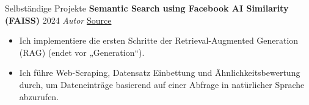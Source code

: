 \begin{rubric}{Selbständige Projekte}
\entry*[] \textbf{Semantic Search using Facebook AI Similarity (FAISS)} \hfill 2024 \newline \emph{Autor} \hfill \href{https://github.com/NathanCorral/Hugging-Face-FAISS-Semantic-Search}{\faGithub Source} \newline
\vspace{\CVItemizeHeaderSpacing} \begin{itemize}[leftmargin=*, rightmargin=1cm] 
	\setlength{\itemsep}{\CVItemizeSpacing}  
	\item Ich implementiere die ersten Schritte der Retrieval-Augmented Generation (RAG) (endet vor „Generation“).
	\item Ich führe Web-Scraping, Datensatz Einbettung und Ähnlichkeitsbewertung durch, um Dateneinträge basierend auf einer Abfrage in natürlicher Sprache abzurufen.
\end{itemize}  
\begin{comment}
\entry*[2021] \textbf{Temporal Convolutional Network} \newline  
Im Rahmen eines Klassenprojekts haben wir das Multi-Stage Temporal Convolutional Network\footnote{Y. Abu Farha et al., "MS-TCN: Multi-Stage Temporal Convolutional Network for Action Segmentation." CVPR 2019.} in PyTorch neu implementiert. Dieses Projekt erreichte: \newline  
\vspace{\CVItemizeHeaderSpacing} \begin{itemize}  
	\setlength{\itemsep}{\CVItemizeSpacing}  
	\item Verständnis für state-of-the-art (2019) Computer-Vision-Netzwerke zur Klassifikation von Videoaktionen.  
	\item Training und Testen des Modells auf einem Teil eines aktiv genutzten Datensatzes ($\approx$30 \% des Breakfast Actions Dataset).  
	\item Verifizierung der im Paper angegebenen Ergebnisse (66 \% Genauigkeit).  
\end{itemize}  

\entry*[2016] \textbf{Tower of Hanoi} \newline  
Ich programmierte einen Roboterarm, um das Spiel Tower of Hanoi vollständig automatisiert zu spielen. Die Projektziele umfassten: \newline  
\vspace{\CVItemizeHeaderSpacing} \begin{itemize}  
	\setlength{\itemsep}{\CVItemizeSpacing}  
	\item Berechnung der inversen Kinematik für einen ROS-gesteuerten Rhino-RX2-Arm und deren Programmierung in C++.  
	\item Anbringung einer nach unten gerichteten Kamera und Entwicklung eines Computer-Vision-Nodes zur Identifizierung von Blöcken in der Roboter-Ebene.  
	\item Festlegung der Turmzentren und Programmierung der Spiellogik von Tower of Hanoi.  
\end{itemize}  
\end{comment}


\end{rubric}

